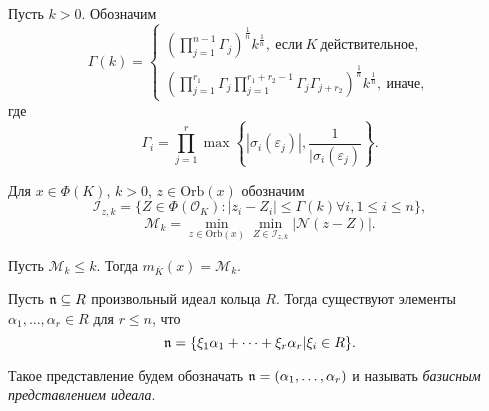 \documentclass[_00_dissertation.tex]{subfiles}
\begin{document}
\begin{definition}
    Пусть $k > 0$.
    Обозначим
    \begin{equation*}
        \Gamma(k) =
        \begin{cases}
            \left(
                \prod\limits_{j=1}^{n-1} \Gamma_j
            \right)^{\frac{1}{n}} k^{\frac{1}{n}},\ \textrm{если}\ K\ \textrm{действительное},\\
            \left(
                \prod\limits_{j=1}^{r_1} \Gamma_j \prod\limits_{j=1}^{r_1+r_2-1} \Gamma_j \Gamma_{j+r_2}
            \right)^{\frac{1}{n}} k^{\frac{1}{n}},\ \textrm{иначе},
        \end{cases}
    \end{equation*}
    где
    \begin{equation*}
        \Gamma_i = \prod\limits_{j=1}^r \max\left\{
            |\sigma_i(\varepsilon_j)|, \frac{1}{|\sigma_i(\varepsilon_j)}
        \right\}.
    \end{equation*}
\end{definition}

\begin{statement}\label{statement:division_with_least_norm_remainder} \cite[с.~1403]{source:Lezowski} 
    Для $x \in \Phi(K)$, $k > 0$, $z \in \textrm{Orb}(x)$ обозначим
    \begin{equation*}
        \mathcal{I}_{z, k} = \{Z \in \Phi(\mathcal{O}_K): |z_i-Z_i| \le \Gamma(k) \forall i, 1 \le i \le n\},
    \end{equation*}
    \begin{equation*}
        \mathcal{M}_k = \min\limits_{z \in \textrm{Orb}(x)} \min\limits_{Z \in \mathcal{I}_{z, k}} |\mathcal{N}(z-Z)|.
    \end{equation*}

    Пусть $\mathcal{M}_k \le k$.
    Тогда $m_{\overline{K}}(x) = \mathcal{M}_k$.
\end{statement}

\begin{definition}
    Пусть $\mathfrak{n} \subseteq R$ произвольный идеал кольца $R$.
    Тогда существуют элементы $\alpha_1, \dots, \alpha_r \in R$ для $r \leq n$, что
    \begin{equation*}
        \mathfrak{n} = \{\xi_1 \alpha_1 + \dots + \xi_r \alpha_r | \xi_i \in R\}.
    \end{equation*}
    
    Такое представление будем обозначать $\mathfrak{n} = (\alpha_1, \dots, \alpha_r)$ и называть \emph{базисным представлением идеала}.
\end{definition}
\end{document}
